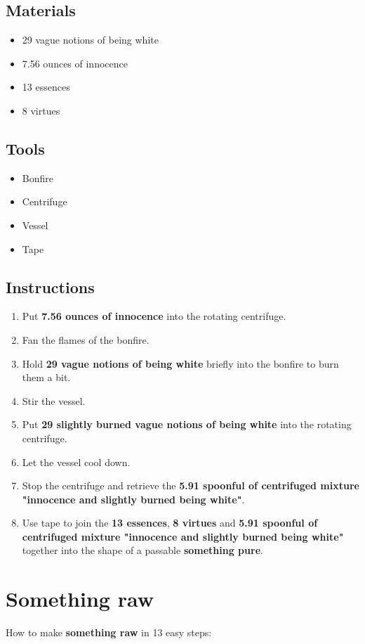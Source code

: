 \documentclass{article}
\begin{document}
\subsection{Materials}\begin{itemize}
\item 
29 vague notions of being white
\item 
7.56 ounces of innocence
\item 
13 essences
\item 
8 virtues
\end{itemize}
\subsection{Tools}\begin{itemize}
\item 
Bonfire
\item 
Centrifuge
\item 
Vessel
\item 
Tape
\end{itemize}
\subsection{Instructions}\begin{enumerate}
\item 
Put \textbf{7.56 ounces of innocence} into the rotating centrifuge.
\item 
Fan the flames of the bonfire.
\item 
Hold \textbf{29 vague notions of being white} briefly into the bonfire to burn them a bit.
\item 
Stir the vessel.
\item 
Put \textbf{29 slightly burned vague notions of being white} into the rotating centrifuge.
\item 
Let the vessel cool down.
\item 
Stop the centrifuge and retrieve the \textbf{5.91 spoonful of centrifuged mixture "innocence and slightly burned being white"}.
\item 
Use tape to join the \textbf{13 essences}, \textbf{8 virtues} and \textbf{5.91 spoonful of centrifuged mixture "innocence and slightly burned being white"} together into the shape of a passable \textbf{something pure}.
\end{enumerate}
\newpage
\section{Something raw}How to make \textbf{something raw} in 13 easy steps:
\end{document}
